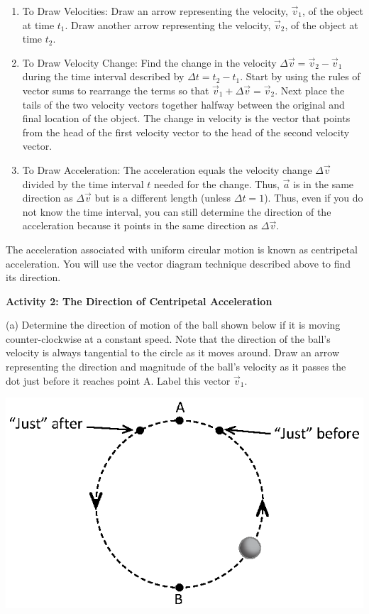 \begin{enumerate}
\item To Draw Velocities: Draw an arrow representing the velocity, \( 
{\vec v}_{1} \), of
the object at time \( t_{1} \). Draw another arrow representing the velocity,
\( {\vec v}_{2} \), of the object at time \( t_{2} \). 
\item To Draw Velocity Change: Find the change in the velocity 
\( \Delta  {\vec v}
= {\vec v}_{2}  - {\vec v}_{1} \) during the time interval described
by \( \Delta  t = t_{2}  - t_{1} \). Start by using the rules of
vector sums to rearrange the terms so that \({\vec v}_{1}  +  \Delta  
{\vec v}
= {\vec v}_{2} \). Next place the tails of the two velocity vectors together
halfway between the original and final location of the object. The change in
velocity is the vector that points from the head of the first velocity vector
to the head of the second velocity vector. 
\item To Draw Acceleration: The acceleration equals the velocity change 
\( \Delta  {\vec v}\)
divided by the time interval $t$ needed for the change. Thus, $\vec a$ is in
the same direction as \( \Delta  {\vec v}\) but is a different length (unless
\( \Delta  t = 1\)). Thus, even if you do not know the time interval, you
can still determine the direction of the acceleration because it points in the
same direction as \( \Delta  {\vec v}\). 
\end{enumerate}
The acceleration associated with uniform circular motion is known as centripetal
acceleration. You will use the vector diagram technique described above to find
its direction. 

\textbf{Activity 2: The Direction of Centripetal Acceleration }

(a) Determine the direction of motion of the ball shown below if it is moving
counter-clockwise at a constant speed. Note that the direction of the ball's
velocity is always tangential to the circle as it moves around. Draw an arrow
representing the direction and magnitude of the ball's velocity as it passes
the dot just before it reaches point A. Label this vector \(\vec v _{1} \). 

{\par\centering \includegraphics{circ_motion/circ_motion_fig2_new.eps} \par}

